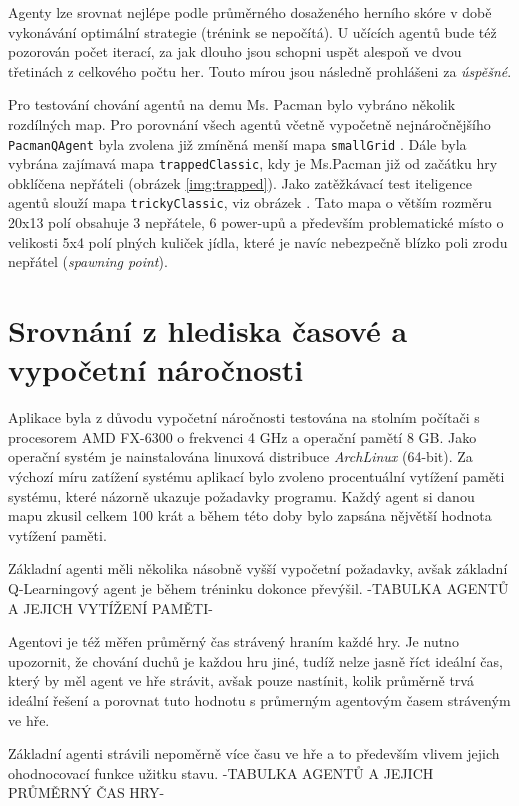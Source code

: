 Agenty lze srovnat nejlépe podle průměrného dosaženého herního skóre v době vykonávání optimální strategie (trénink se nepočítá). U učících agentů bude též pozorován počet iterací, za jak dlouho jsou schopni uspět alespoň ve dvou třetinách z celkového počtu her. Touto mírou jsou následně prohlášeni za \textit{úspěšné}. 

Pro testování chování agentů na demu Ms. Pacman bylo vybráno několik rozdílných map. Pro porovnání všech agentů včetně vypočetně nejnáročnějšího \texttt{PacmanQAgent} byla zvolena již zmíněná menší mapa \texttt{smallGrid} \label{img:smallL}. Dále byla vybrána zajímavá mapa \texttt{trappedClassic}, kdy je Ms.Pacman již od začátku hry obklíčena nepřáteli (obrázek \ref{img:trapped}). Jako zatěžkávací test iteligence agentů slouží mapa \texttt{trickyClassic}, viz obrázek \label{img:tricky}. Tato mapa o větším rozměru 20x13 polí obsahuje 3 nepřátele, 6 power-upů a především problematické místo o velikosti 5x4 polí plných kuliček jídla, které je navíc nebezpečně blízko poli zrodu nepřátel (\textit{spawning point}).

\section{Srovnání z hlediska časové a vypočetní náročnosti}
Aplikace byla z důvodu vypočetní náročnosti testována na stolním počítači s procesorem AMD FX-6300 o frekvenci 4 GHz a operační pamětí 8 GB. Jako operační systém je nainstalována linuxová distribuce \textit{ArchLinux} (64-bit). Za výchozí míru zatížení systému aplikací bylo zvoleno procentuální vytížení paměti systému, které názorně ukazuje požadavky programu. Každý agent si danou mapu zkusil celkem 100 krát a během této doby bylo zapsána nějvětší hodnota vytížení paměti.

Základní agenti měli několika násobně vyšší vypočetní požadavky, avšak základní Q-Learningový agent je během tréninku dokonce převýšil.
-TABULKA AGENTŮ A JEJICH VYTÍŽENÍ PAMĚTI-


Agentovi je též měřen průměrný čas strávený hraním každé hry. Je nutno upozornit, že chování duchů je každou hru jiné, tudíž nelze jasně říct ideální čas, který by měl agent ve hře strávit, avšak pouze nastínit, kolik průměrně trvá ideální řešení a porovnat tuto hodnotu s průmerným agentovým časem stráveným ve hře.

Základní agenti strávili nepoměrně více času ve hře a to především vlivem jejich ohodnocovací funkce užitku stavu.
-TABULKA AGENTŮ A JEJICH PRŮMĚRNÝ ČAS HRY-


